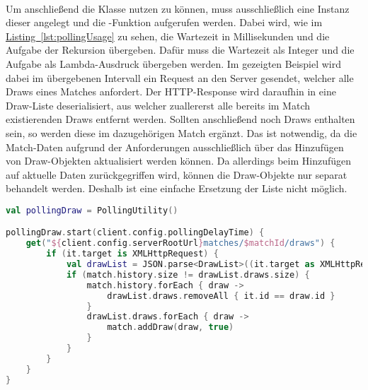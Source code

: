 \\
Um anschließend die Klasse  nutzen zu können, muss ausschließlich eine Instanz dieser angelegt und die -Funktion aufgerufen werden. Dabei wird, wie im \hyperref[lst:pollingUsage]{Listing~\ref{lst:pollingUsage}} zu sehen, die Wartezeit in Millisekunden und die Aufgabe der Rekursion übergeben. Dafür muss die Wartezeit als Integer und die Aufgabe als Lambda-Ausdruck übergeben werden. Im gezeigten Beispiel wird dabei im übergebenen Intervall ein Request an den Server gesendet, welcher alle Draws eines Matches anfordert. Der \gls{HTTP}-Response wird daraufhin in eine Draw-Liste deserialisiert, aus welcher zuallererst alle bereits im Match existierenden Draws entfernt werden. Sollten anschließend noch Draws enthalten sein, so werden diese im dazugehörigen Match ergänzt. Das ist notwendig, da die Match-Daten aufgrund der Anforderungen ausschließlich über das Hinzufügen von Draw-Objekten aktualisiert werden können. Da allerdings beim Hinzufügen auf aktuelle Daten zurückgegriffen wird, können die Draw-Objekte nur separat behandelt werden. Deshalb ist eine einfache Ersetzung der Liste nicht möglich.\\
\begin{lstlisting}[style=lstStyleFramed, language=Kotlin, caption={Einbindung bzw. Nutzung der \code{PollingUtility} Klasse}, label=lst:pollingUsage, float]
val pollingDraw = PollingUtility()

pollingDraw.start(client.config.pollingDelayTime) {
	get("${client.config.serverRootUrl}matches/$matchId/draws") {
		if (it.target is XMLHttpRequest) {
			val drawList = JSON.parse<DrawList>((it.target as XMLHttpRequest).responseText)
			if (match.history.size != drawList.draws.size) {
				match.history.forEach { draw ->
					drawList.draws.removeAll { it.id == draw.id }
				}
				drawList.draws.forEach { draw ->
					match.addDraw(draw, true)
				}
			}
		}
	}
}
\end{lstlisting}